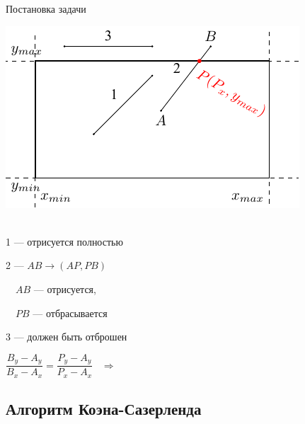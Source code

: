 \documentclass[10pt]{beamer}
\begin{document}
	
	\begin{frame}{Постановка задачи}
		
		\begin{center}
			{
				\includegraphics[page=1]{line_slise.pdf}
			}
			{
				~ \\
				
				1 --- отрисуется полностью
				
				2 --- $AB \rightarrow (AP, PB)$ 
				
				\ \ $AB$ --- отрисуется,
				
				\ \ $PB$ --- отбрасывается
				
				
				3 --- должен быть отброшен
			
			}
			
		\end{center}
		
		$\dfrac{B_y-A_y}{B_x-A_x} = \dfrac{P_y-A_y}{P_x-A_x}$
		~$\Rightarrow$~ 
		

		
		
	\end{frame}
	
	
	\subsection{Алгоритм Коэна-Сазерленда}		
	
    \frame{\subsectionpage}
	
\end{document}
